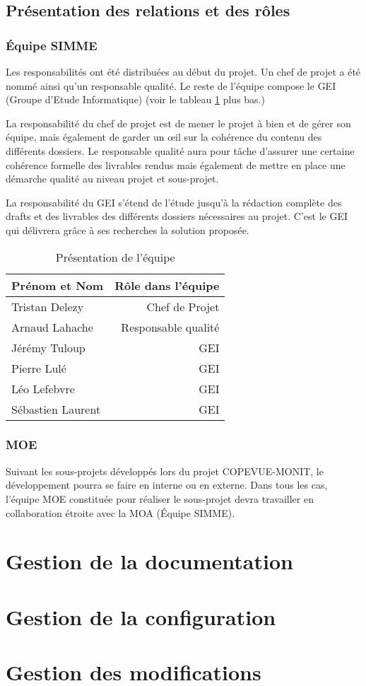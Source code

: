 \documentclass{mise_en_page}
\begin{document}
\subsection{Présentation des relations et des rôles}

\subsubsection{Équipe SIMME}

Les responsabilités ont été distribuées au début du projet. Un chef de projet a été nommé ainsi qu'un responsable qualité. Le reste de l'équipe compose le GEI (Groupe d'Etude Informatique) (voir le tableau \ref{tab_equipe} plus bas.)

La responsabilité du chef de projet est de mener le projet à bien et de gérer son équipe, mais également de garder un \oe{}il sur la cohérence du contenu des différents dossiers. Le responsable qualité aura pour tâche d'assurer une certaine cohérence formelle des livrables rendus mais également de mettre en place une démarche qualité au niveau projet et sous-projet.

La responsabilité du GEI s'étend de l'étude jusqu'à la rédaction complète des drafts et des livrables des différents dossiers nécessaires au projet. C'est le GEI qui délivrera grâce à ses recherches la solution proposée.

\begin{table}[h]
	\centering
	\begin{tabular}{l r}
		\toprule
		\textbf{Prénom et Nom} & \textbf{Rôle dans l'équipe}\\
		\toprule
		Tristan Delezy & Chef de Projet \\
		Arnaud Lahache & Responsable qualité \\
		\midrule
		Jérémy Tuloup & GEI \\
		Pierre Lulé & GEI \\
		Léo Lefebvre & GEI \\
		Sébastien Laurent & GEI \\
		\bottomrule
	\end{tabular}
	\caption{\label{tab_equipe} Présentation de l'équipe}
\end{table}

\subsubsection{MOE}

Suivant les sous-projets développés lors du projet COPEVUE-MONIT, le développement pourra se faire en interne ou en externe. Dans tous les cas, l'équipe MOE constituée pour réaliser le sous-projet devra travailler en collaboration étroite avec la MOA (Équipe SIMME).



\section{Gestion de la documentation}



\section{Gestion de la configuration}

\section{Gestion des modifications}
\end{document}
